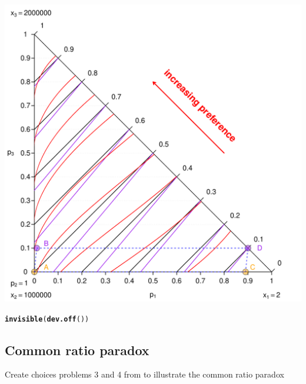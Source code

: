 \documentclass{article}\usepackage[]{graphicx}\usepackage[]{color}
\makeatletter
\newcommand{\hlstd}[1]{\textcolor[rgb]{0.345,0.345,0.345}{#1}}%
\newcommand{\hlkwd}[1]{\textcolor[rgb]{0.737,0.353,0.396}{\textbf{#1}}}%
\newenvironment{kframe}{%
 \def\at@end@of@kframe{}%
 \ifinner\ifhmode%
  \def\at@end@of@kframe{\end{minipage}}%
  \begin{minipage}{\columnwidth}%
 \fi\fi%
 \def\FrameCommand##1{\hskip\@totalleftmargin \hskip-\fboxsep
 \colorbox{shadecolor}{##1}\hskip-\fboxsep
     \hskip-\linewidth \hskip-\@totalleftmargin \hskip\columnwidth}%
 \MakeFramed {\advance\hsize-\width
   \@totalleftmargin\z@ \linewidth\hsize
   \@setminipage}}%
 {\par\unskip\endMakeFramed%
 \at@end@of@kframe}
\newenvironment{knitrout}{}{} %
\makeatother
\begin{document}
\begin{knitrout}
{\centering \includegraphics[width=0.8\linewidth]{figure/unnamed-chunk-11} 

}


\begin{kframe}\begin{alltt}
\hlkwd{invisible}\hlstd{(}\hlkwd{dev.off}\hlstd{())}
\end{alltt}
\end{kframe}
\end{knitrout}


\subsection{Common ratio paradox}

Create choices problems 3 and 4 from \citet[][p. 266]{Kahneman_Tversky_1979} to illustrate the common ratio paradox
\end{document}
